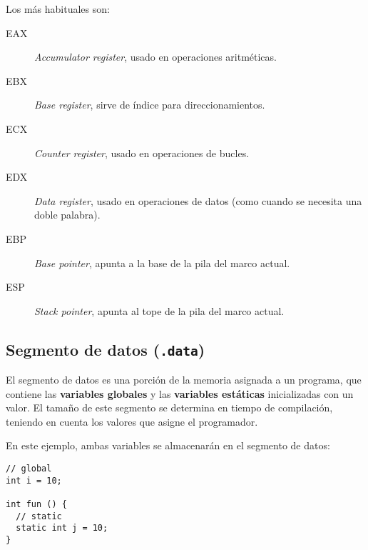 \documentclass[11pt]{scrartcl}
\begin{document}

Los más habituales son:

\begin{description}
\item[EAX] \textit{Accumulator register}, usado en operaciones aritméticas.
\item[EBX] \textit{Base register}, sirve de índice para direccionamientos.
\item[ECX] \textit{Counter register}, usado en operaciones de bucles.
\item[EDX] \textit{Data register}, usado en operaciones de datos (como cuando se
  necesita una doble palabra).
\item[EBP] \textit{Base pointer}, apunta a la base de la pila del marco actual.
\item[ESP] \textit{Stack pointer}, apunta al tope de la pila del marco actual.
\end{description}

\subsection{Segmento de datos (\texttt{.data})}
El segmento de datos es una porción de la memoria asignada a un programa, que
contiene las \textbf{variables globales} y las \textbf{variables estáticas}
inicializadas con un valor. El tamaño de este segmento se determina en tiempo de
compilación, teniendo en cuenta los valores que asigne el programador.

En este ejemplo, ambas variables se almacenarán en el segmento de datos:
\begin{verbatim}
// global
int i = 10;

int fun () {
  // static
  static int j = 10;  
}
\end{verbatim}
\end{document}
